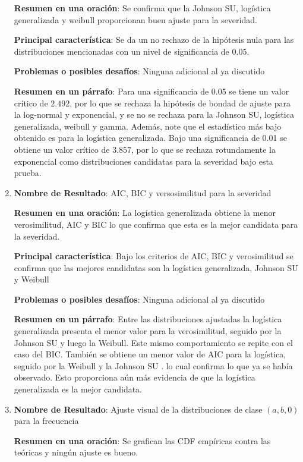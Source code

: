 \documentclass[
  letterpaper,
  onepage,
  openany]{scrreprt}
\begin{document}
\begin{enumerate}
  \textbf{Resumen en una oración}: Se confirma que la Johnson SU,
  logística generalizada y weibull proporcionan buen ajuste para la
  severidad.

  \textbf{Principal característica}: Se da un no rechazo de la hipótesis
  nula para las distribuciones mencionadas con un nivel de significancia
  de 0.05.

  \textbf{Problemas o posibles desafíos}: Ninguna adicional al ya
  discutido

  \textbf{Resumen en un párrafo}: Para una significancia de 0.05 se
  tiene un valor crítico de \(2.492\), por lo que se rechaza la
  hipótesis de bondad de ajuste para la log-normal y exponencial, y se
  no se rechaza para la Johnson SU, logística generalizada, weibull y
  gamma. Además, note que el estadístico más bajo obtenido es para la
  logística generalizada. Bajo una significancia de 0.01 se obtiene un
  valor crítico de \(3.857\), por lo que se rechaza rotundamente la
  exponencial como distribuciones candidatas para la severidad bajo esta
  prueba.
\item
  \textbf{Nombre de Resultado}: AIC, BIC y versosimilitud para la
  severidad

  \textbf{Resumen en una oración}: La logística generalizada obtiene la
  menor verosimilitud, AIC y BIC lo que confirma que esta es la mejor
  candidata para la severidad.

  \textbf{Principal característica}: Bajo los criterios de AIC, BIC y
  verosimilitud se confirma que las mejores candidatas son la logística
  generalizada, Johnson SU y Weibull

  \textbf{Problemas o posibles desafíos}: Ninguna adicional al ya
  discutido

  \textbf{Resumen en un párrafo}: Entre las distribuciones ajustadas la
  logística generalizada presenta el menor valor para la verosimilitud,
  seguido por la Johnson SU y luego la Weibull. Este mismo
  comportamiento se repite con el caso del BIC. También se obtiene un
  menor valor de AIC para la logística, seguido por la Weibull y la
  Johnson SU . lo cual confirma lo que ya se había observado. Esto
  proporciona aún más evidencia de que la logística generalizada es la
  mejor candidata.
\item
  \textbf{Nombre de Resultado}: Ajuste visual de la distribuciones de
  clase \((a,b,0)\) para la frecuencia

  \textbf{Resumen en una oración}: Se grafican las CDF empíricas contra
  las teóricas y ningún ajuste es bueno.


\end{enumerate}
\end{document}
